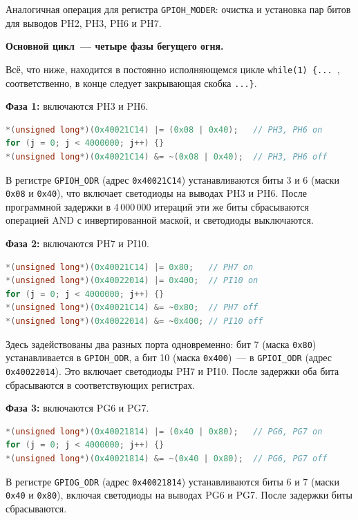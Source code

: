 Аналогичная операция для регистра \texttt{GPIOH\_MODER}: очистка и установка пар битов для выводов PH2, PH3, PH6 и PH7.


\textbf{Основной цикл~--- четыре фазы бегущего огня.}

Всё, что ниже, находится в постоянно исполняющемся цикле \verb|while(1) {... |, соответственно, в конце следует закрывающая скобка \verb|...}|.

\textbf{Фаза 1:} включаются PH3 и PH6.

\begin{lstlisting}[language=C]
*(unsigned long*)(0x40021C14) |= (0x08 | 0x40);   // PH3, PH6 on
for (j = 0; j < 4000000; j++) {}
*(unsigned long*)(0x40021C14) &= ~(0x08 | 0x40);  // PH3, PH6 off
\end{lstlisting}

В регистре \texttt{GPIOH\_ODR} (адрес \texttt{0x40021C14}) устанавливаются биты 3 и 6 (маски \texttt{0x08} и \texttt{0x40}), что включает светодиоды на выводах PH3 и PH6. После программной задержки в 4\,000\,000 итераций эти же биты сбрасываются операцией AND с инвертированной маской, и светодиоды выключаются.


\textbf{Фаза 2:} включаются PH7 и PI10.

\begin{lstlisting}[language=C]
*(unsigned long*)(0x40021C14) |= 0x80;   // PH7 on
*(unsigned long*)(0x40022014) |= 0x400;  // PI10 on
for (j = 0; j < 4000000; j++) {}
*(unsigned long*)(0x40021C14) &= ~0x80;  // PH7 off
*(unsigned long*)(0x40022014) &= ~0x400; // PI10 off
\end{lstlisting}

Здесь задействованы два разных порта одновременно: бит 7 (маска \texttt{0x80}) устанавливается в \texttt{GPIOH\_ODR}, а бит 10 (маска \texttt{0x400})~--- в \texttt{GPIOI\_ODR} (адрес \texttt{0x40022014}). Это включает светодиоды PH7 и PI10. После задержки оба бита сбрасываются в соответствующих регистрах.

\textbf{Фаза 3:} включаются PG6 и PG7.

\begin{lstlisting}[language=C]
*(unsigned long*)(0x40021814) |= (0x40 | 0x80);   // PG6, PG7 on
for (j = 0; j < 4000000; j++) {}
*(unsigned long*)(0x40021814) &= ~(0x40 | 0x80);  // PG6, PG7 off
\end{lstlisting}

В регистре \texttt{GPIOG\_ODR} (адрес \texttt{0x40021814}) устанавливаются биты 6 и 7 (маски \texttt{0x40} и \texttt{0x80}), включая светодиоды на выводах PG6 и PG7. После задержки биты сбрасываются.

